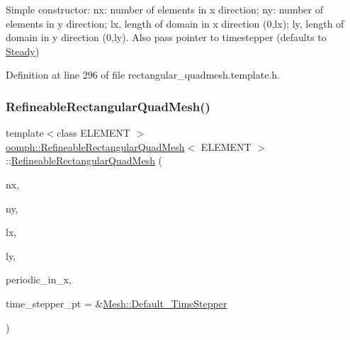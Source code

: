 Simple constructor\+: nx\+: number of elements in x direction; ny\+: number of elements in y direction; lx, length of domain in x direction (0,lx); ly, length of domain in y direction (0,ly). Also pass pointer to timestepper (defaults to \hyperlink{classoomph_1_1Steady}{Steady}) 



Definition at line 296 of file rectangular\+\_\+quadmesh.\+template.\+h.

\mbox{\label{classoomph_1_1RefineableRectangularQuadMesh_aa49c7a67bd80678dd088430d7fc0bfc9}} 
\subsubsection{\texorpdfstring{Refineable\+Rectangular\+Quad\+Mesh()}{RefineableRectangularQuadMesh()}\hspace{0.1cm}{\footnotesize\ttfamily [2/4]}}
{\footnotesize\ttfamily template$<$class E\+L\+E\+M\+E\+NT $>$ \\
\hyperlink{classoomph_1_1RefineableRectangularQuadMesh}{oomph\+::\+Refineable\+Rectangular\+Quad\+Mesh}$<$ E\+L\+E\+M\+E\+NT $>$\+::\hyperlink{classoomph_1_1RefineableRectangularQuadMesh}{Refineable\+Rectangular\+Quad\+Mesh} (\begin{DoxyParamCaption}\item[{const unsigned \&}]{nx,  }\item[{const unsigned \&}]{ny,  }\item[{const double \&}]{lx,  }\item[{const double \&}]{ly,  }\item[{const bool \&}]{periodic\+\_\+in\+\_\+x,  }\item[{\hyperlink{classoomph_1_1TimeStepper}{Time\+Stepper} $\ast$}]{time\+\_\+stepper\+\_\+pt = {\ttfamily \&\hyperlink{classoomph_1_1Mesh_a12243d0fee2b1fcee729ee5a4777ea10}{Mesh\+::\+Default\+\_\+\+Time\+Stepper}} }\end{DoxyParamCaption})\hspace{0.3cm}{\ttfamily [inline]}}



